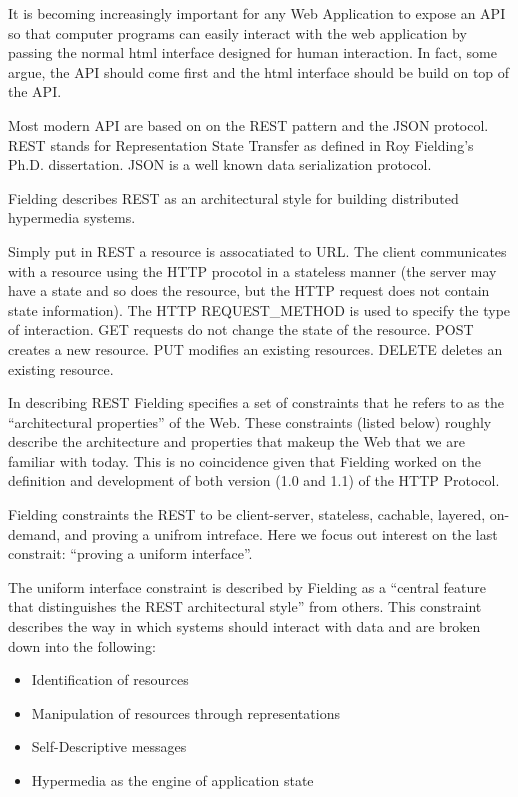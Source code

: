 \documentclass[12pt]{article}
\begin{document}

It is becoming increasingly important for any Web Application to expose an API so that computer programs can easily interact with the web application by passing the normal html interface designed for human interaction. In fact, some argue, the API should come first and the html interface should be build on top of the API.

Most modern API are based on on the REST pattern and the JSON protocol.
REST stands for Representation State Transfer as defined in Roy Fielding’s Ph.D.
dissertation. JSON is a well known data serialization protocol.

Fielding describes REST as an architectural style for building
distributed hypermedia systems. 

Simply put in REST a resource is assocatiated to URL. The client communicates with a resource using the HTTP procotol in a stateless manner (the server may have a state and so does the resource, but the HTTP request does not contain state information). The HTTP REQUEST_METHOD is used to specify the type of interaction. GET requests do not change the state of the resource. POST creates a new resource. PUT modifies an existing resources. DELETE deletes an existing resource.

In describing REST Fielding specifies a set of
constraints that he refers to as the ``architectural properties'' of the Web. These
constraints (listed below) roughly describe the architecture and properties that
makeup the Web that we are familiar with today. This is no coincidence given that
Fielding worked on the definition and development of both version (1.0 and 1.1) of
the HTTP Protocol.

Fielding constraints the REST to be client-server, stateless, cachable, layered, on-demand, and proving a unifrom intreface. Here we focus out interest on the last constrait: ``proving a 
uniform interface''.

The uniform interface constraint is described by Fielding as a ``central feature that
distinguishes the REST architectural style'' from others. This constraint describes
the way in which systems should interact with data and are broken down into the
following:

\begin{itemize}
\item Identification of resources
\item Manipulation of resources through representations
\item Self-Descriptive messages
\item Hypermedia as the engine of application state
\end{itemize}
\end{document}
